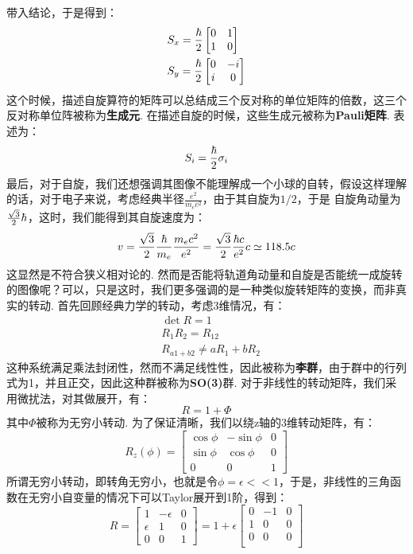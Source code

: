带入结论，于是得到：
\begin{align*}
& {S}_{x} =\frac{\hbar}{2} 
\begin{bmatrix}
0 & 1 \\
1 & 0
\end{bmatrix} \\
& {S}_{y} = \frac{\hbar}{2}
\begin{bmatrix}
0 & -i \\
i & 0
\end{bmatrix}
\end{align*}
这个时候，描述自旋算符的矩阵可以总结成三个反对称的单位矩阵的倍数，这三个反对称单位阵被称为\textbf{生成元}. 
在描述自旋的时候，这些生成元被称为\textbf{Pauli矩阵}. 表述为：
\[
{S}_{i} = \frac{\hbar}{2}\sigma_{i}
\]
最后，对于自旋，我们还想强调其图像不能理解成一个小球的自转，假设这样理解的话，对于电子来说，考虑经典半径\(\frac{e^2}{m_{e}c^2}\)，由于其自旋为\(1/2\)，于是
自旋角动量为\(\frac{\sqrt{3}}{2}\hbar\)，这时，我们能得到其自旋速度为：
\[
v = \frac{\sqrt{3}}{2}\frac{\hbar}{m_{e}}\frac{m_{e}c^2}{e^2} = \frac{\sqrt{3}}{2}\frac{\hbar c}{e^2}c \simeq 118.5c
\]
这显然是不符合狭义相对论的. 然而是否能将轨道角动量和自旋是否能统一成旋转的图像呢？可以，只是这时，我们更多强调的是一种类似旋转矩阵的变换，而非真实的转动. 
首先回顾经典力学的转动，考虑3维情况，有：
\begin{align*}
& \det{R} = 1 \\
& R_{1}R_{2} = R_{12} \\
& R_{a1+b2} \neq aR_{1} + bR_{2}
\end{align*}
这种系统满足乘法封闭性，然而不满足线性性，因此被称为\textbf{李群}，由于群中的行列式为1，并且正交，因此这种群被称为\textbf{SO(3)}群. 
对于非线性的转动矩阵，我们采用微扰法，对其做展开，有：
\[
R = 1 + \Phi
\]
其中\(\Phi\)被称为无穷小转动. 为了保证清晰，我们以绕z轴的3维转动矩阵，有：
\[
R_{z}(\phi) =
\begin{bmatrix}
\cos\phi & -\sin\phi & 0 \\
\sin\phi & \cos\phi & 0 \\
0 & 0 & 1
\end{bmatrix}
\]
所谓无穷小转动，即转角无穷小，也就是令\(\phi = \epsilon << 1\)，于是，非线性的三角函数在无穷小自变量的情况下可以Taylor展开到1阶，得到：
\[
R = 
\begin{bmatrix}
1 & -\epsilon & 0 \\
\epsilon & 1 & 0  \\
0 & 0 & 1 
\end{bmatrix}
= 1 + 
\epsilon
\begin{bmatrix}
0 & -1 & 0 \\
1 & 0  & 0 \\
0 & 0  & 0 \\
\end{bmatrix}
\]
